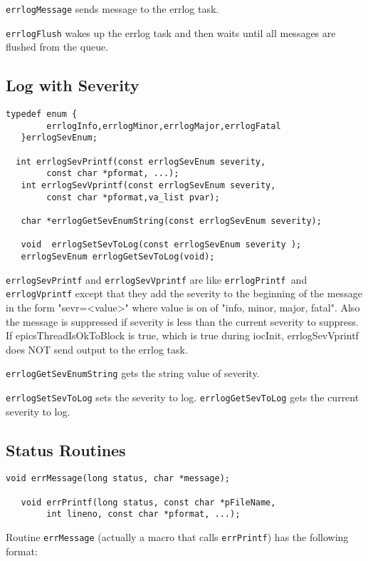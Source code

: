 \verb|errlogMessage| sends message to the errlog task.

\verb|errlogFlush| wakes up the errlog task and then waits until all messages are flushed from the queue.

\subsection{Log with Severity}

\begin{verbatim}typedef enum {
        errlogInfo,errlogMinor,errlogMajor,errlogFatal
   }errlogSevEnum;

  int errlogSevPrintf(const errlogSevEnum severity,
        const char *pformat, ...);
   int errlogSevVprintf(const errlogSevEnum severity,
        const char *pformat,va_list pvar);

   char *errlogGetSevEnumString(const errlogSevEnum severity);

   void  errlogSetSevToLog(const errlogSevEnum severity );
   errlogSevEnum errlogGetSevToLog(void);
\end{verbatim}
\verb|errlogSevPrintf| and \verb|errlogSevVprintf| are like \verb|errlogPrintf |and  \verb|errlogVprintf| except that they 
add the severity to the beginning of the message in the form "sevr=\textless{}value\textgreater{}" where value is on of "info, minor, major, 
fatal". Also the message is suppressed if  severity is less than the current severity to suppress. If epicsThreadIsOkToBlock 
is true, which is true during iocInit, errlogSevVprintf does NOT send output to the errlog task.

\verb|errlogGetSevEnumString| gets the string value of severity. 

 \verb|errlogSetSevToLog| sets the severity to log. \verb|errlogGetSevToLog| gets the current severity to log.

\subsection{Status Routines }

\begin{verbatim}void errMessage(long status, char *message);

   void errPrintf(long status, const char *pFileName,
        int lineno, const char *pformat, ...);
\end{verbatim}
Routine \verb|errMessage| (actually a macro that calls \verb|errPrintf|) has the following format:

